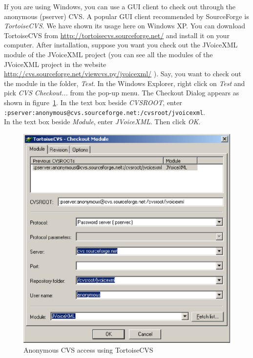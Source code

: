 \documentclass[11pt,a4paper]{article}
\begin{document}
If you are using Windows, you can use a GUI client to check out through the 
anonymous (pserver) CVS. A popular GUI client recommended by 
SourceForge\cite{sourceforge} is \emph{TortoiseCVS}. 
We have shown its usage here on 
Windows XP. You can download TortoiseCVS from 
\url{http://tortoisecvs.sourceforge.net/} and install it on your computer. 
After installation, suppose you want you check out the JVoiceXML module of the
JVoiceXML project (you can see all the modules of the JVoiceXML project in 
the website \url{http://cvs.sourceforge.net/viewcvs.py/jvoicexml/} ). 
Say, you want to check out the module in the folder, \emph{Test}. 
In the Windows Explorer, right click on \emph{Test} and pick 
\emph{CVS Checkout...}
from the pop-up menu. The Checkout Dialog appears as shown in 
figure~\ref{fig:tortoise-anonymous}.
In the text box beside \emph{CVSROOT}, enter \\
\texttt{:pserver:anonymous@cvs.sourceforge.net:/cvsroot/jvoicexml}.\\
In the text box beside \emph{Module}, enter \emph{JVoiceXML}. 
Then click \emph{OK}.

\begin{figure}
\label{fig:tortoise-anonymous}
\caption{Anonymous CVS access using TortoiseCVS}
\begin{center}
\includegraphics[scale=0.5]{tortoise-anonymous.eps}
\end{center}
\end{figure}
\end{document}
